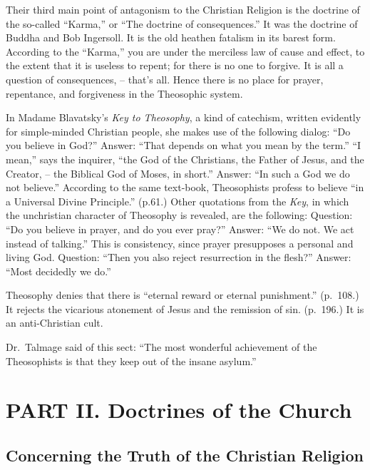 \documentclass[
]{book}
\begin{document}
Their third main point of antagonism to the Christian Religion is the doctrine of the so-called ``Karma,'' or ``The doctrine of consequences.'' It was the doctrine of Buddha and Bob Ingersoll. It is the old heathen fatalism in its barest form. According to the ``Karma,'' you are under the merciless law of cause and effect, to the extent that it is useless to repent; for there is no one to forgive. It is all a question of consequences, -- that's all. Hence there is no place for prayer, repentance, and forgiveness in the Theosophic system.

In Madame Blavatsky's \emph{Key to Theosophy}, a kind of catechism, written evidently for simple-minded Christian people, she makes use of the following dialog: ``Do you believe in God?'' Answer: ``That depends on what you mean by the term.'' ``I mean,'' says the inquirer, ``the God of the Christians, the Father of Jesus, and the Creator, -- the Biblical God of Moses, in short.'' Answer: ``In such a God we do not believe.'' According to the same text-book, Theosophists profess to believe ``in a Universal Divine Principle.'' (p.61.) Other quotations from the \emph{Key}, in which the unchristian character of Theosophy is revealed, are the following: Question: ``Do you believe in prayer, and do you ever pray?'' Answer: ``We do not. We act instead of talking.'' This is consistency, since prayer presupposes a personal and living God. Question: ``Then you also reject resurrection in the flesh?'' Answer: ``Most decidedly we do.''

Theosophy denies that there is ``eternal reward or eternal punishment.'' (p.~108.) It rejects the vicarious atonement of Jesus and the remission of sin. (p.~196.) It is an anti-Christian cult.

Dr.~Talmage said of this sect: ``The most wonderful achievement of the Theosophists is that they keep out of the insane asylum.''

\chapter*{PART II. Doctrines of the Church}\label{part-ii.-doctrines-of-the-church}

\section*{\texorpdfstring{Concerning the Truth of the Christian Religion}{Concerning the Truth of the Christian Religion}}\label{concerning-the-truth-of-the-christian-religion}
\end{document}
